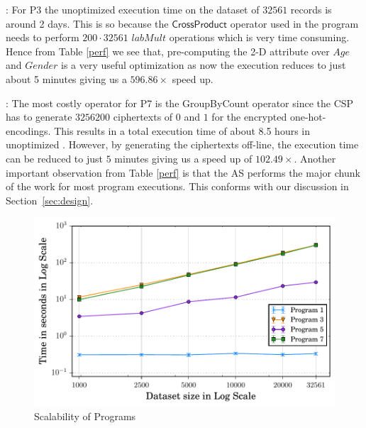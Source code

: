 : For P3 the unoptimized execution time on the dataset of $32561$ records is around 2 days. This is so because the $\textsf{CrossProduct}$ operator used in the program needs to perform $200\cdot 32561$ $labMult$ operations which is very time consuming. Hence from Table \ref{perf} we see that, pre-computing the 2-D attribute over $Age$ and $Gender$ is a very useful optimization as now the execution reduces to just about 5 minutes giving us a $596.86\times$ speed up.  %

:
The most costly operator for P7 is the \textsf{GroupByCount} operator since the \textsf{CSP} has to generate $3256200$ ciphertexts of $0$ and $1$ for the encrypted one-hot-encodings. This results in a  total execution time of about 8.5 hours in unoptimized \system. However, by generating the ciphertexts off-line, the execution time can be reduced to just $5$ minutes giving us a speed up of $102.49\times$.
Another important observation from Table \ref{perf} is that the \textsf{AS} performs the major chunk of the work for most program executions. This conforms with our discussion in Section~\ref{sec:design}.
\vspace{-0.2cm}\begin{figure}[ht]
      \includegraphics[width=0.5\linewidth]{scale_finals.pdf}
        \caption{Scalability of \system Programs }\label{scale}
    \end{figure}

